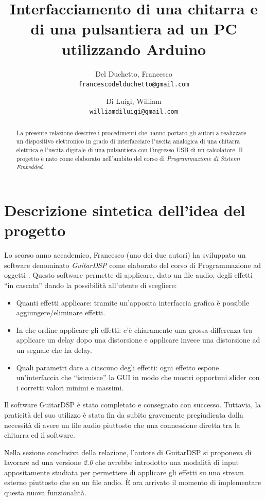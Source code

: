 \documentclass[a4paper,11pt]{article}
\title{Interfacciamento di una chitarra e di una pulsantiera ad un PC utilizzando Arduino}
\author{
	Del Duchetto, Francesco\\
	\texttt{francescodelduchetto@gmail.com}
	\and
	Di Luigi, William\\
	\texttt{williamdiluigi@gmail.com}
}
\begin{document}
\maketitle

\begin{abstract}
	La presente relazione descrive i procedimenti che hanno portato gli autori a realizzare un dispositivo elettronico in grado di interfacciare l'uscita analogica di una chitarra elettrica e l'uscita digitale di una pulsantiera con l'ingresso USB di un calcolatore. Il progetto è nato come elaborato nell'ambito del corso di \emph{Programmazione di Sistemi Embedded}.
\end{abstract}

\section{Descrizione sintetica dell'idea del progetto}

Lo scorso anno accademico, Francesco (uno dei due autori) ha sviluppato un software denominato \emph{GuitarDSP} come elaborato del corso di Programmazione ad oggetti \cite{delduchetto2014}. Questo software permette di applicare, dato un file audio, degli effetti ``in cascata'' dando la possibilità all'utente di scegliere:
\begin{itemize}
	\item Quanti effetti applicare: tramite un'apposita interfaccia grafica è possibile aggiungere/eliminare effetti.
	\item In che ordine applicare gli effetti: c'è chiaramente una grossa differenza tra applicare un delay dopo una distorsione e applicare invece una distorsione ad un segnale che ha delay.
	\item Quali parametri dare a ciascuno degli effetti: ogni effetto espone un'interfaccia che ``istruisce'' la GUI in modo che mostri opportuni slider con i corretti valori minimi e massimi.
\end{itemize}

Il software GuitarDSP è stato completato e consegnato con successo. Tuttavia, la praticità del suo utilizzo è stata fin da subito gravemente pregiudicata dalla necessità di avere un file audio piuttosto che una connessione diretta tra la chitarra ed il software.

Nella sezione conclusiva della relazione, l'autore di GuitarDSP si proponeva di lavorare ad una versione \emph{2.0} che avrebbe introdotto una modalità di input appositamente studiata per permettere di applicare gli effetti su uno stream esterno piuttosto che su un file audio. È ora arrivato il momento di implementare questa nuova funzionalità.
\end{document}
